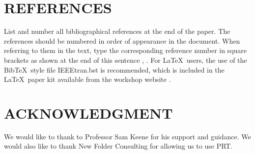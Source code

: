 \documentclass{article}
\begin{document}
\begin{sloppy}
\section{REFERENCES}
\label{sec:ref}

List and number all bibliographical references at the end 
of the paper. The references should be numbered in order 
of appearance in the document. When referring to them in 
the text, type the corresponding reference number in 
square brackets as shown at the end of this sentence 
\cite{cJones2003}, \cite{aSmith2000}. For \LaTeX\ users, 
the use of the Bib\TeX\ style file IEEEtran.bst is 
recommended, which is included in the \LaTeX\ paper 
kit available from the workshop website \cite{aaspweb}.

\section{ACKNOWLEDGMENT}
\label{sec:ack}

We would like to thank to Professor Sam Keene for his support and guidance. 
We would also like to thank New Folder Consulting for allowing us to use PRT.




% 
%
%
%
% 
%
% 
% 
%
%


\end{sloppy}
\end{document}
